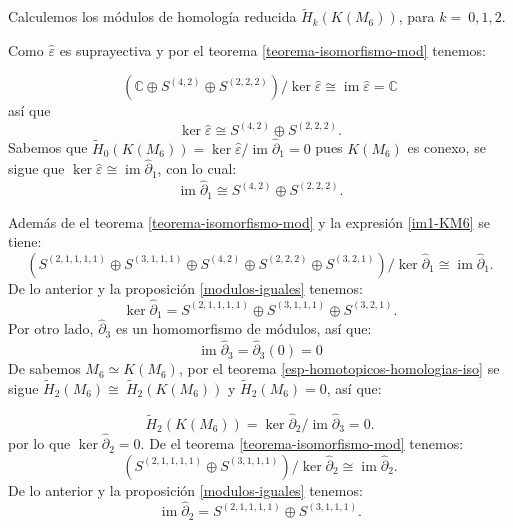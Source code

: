 \documentclass[12pt]{book}
\theoremstyle{definition}
\DeclareMathOperator{\im}{im}
\newcounter{in}
\begin{document}

Calculemos los módulos de homología reducida $\widetilde
H_{k}(K(M_{6}))$, para $k=~0,1,2$.

Como $\widehat\varepsilon$ es suprayectiva y por el teorema
\ref{teorema-isomorfismo-mod} tenemos:

\begin{equation*}
  (\mathbb{C} \oplus S^{(4,2)}\oplus S^{(2,2,2)})/\ker\widehat\varepsilon\cong \im \widehat\varepsilon=\mathbb{C}
\end{equation*}
así que
\begin{equation*}
  \label{ker0-KM6}
  \ker\widehat\varepsilon\cong S^{(4,2)}\oplus S^{(2,2,2)}.
\end{equation*}
Sabemos que $\widetilde H_{0}(K(M_{6}))=\ker \widehat\varepsilon/\im
\widehat\partial_{1}=0$ pues $K(M_{6})$ es conexo, se sigue que $\ker \widehat\varepsilon\cong
\im\widehat\partial_{1}$, con lo cual:
\begin{equation}
  \label{im1-KM6}
  \im \widehat\partial_{1}\cong S^{(4,2)}\oplus S^{(2,2,2)}.
\end{equation}

Además de el teorema \ref{teorema-isomorfismo-mod} y la expresión \ref{im1-KM6} se tiene:
$$(S^{(2,1,1,1,1)}\oplus S^{(3,1,1,1)}\oplus S^{(4,2)}\oplus
      S^{(2,2,2)}\oplus S^{(3,2,1)})/\ker \widehat\partial_{1}\cong \im \widehat\partial_{1}.$$
De lo anterior y la proposición \ref{modulos-iguales} tenemos:
\begin{equation}
  \label{ker1-KM6}
  \ker \widehat\partial_{1}=S^{(2,1,1,1,1)}\oplus S^{(3,1,1,1)}\oplus S^{(3,2,1)}.
\end{equation}
Por otro lado, $\widehat\partial_{3}$ es un homomorfismo de módulos, así que:
\begin{equation*}
\im\widehat\partial_{3}=\widehat\partial_{3}(0)=0
\label{im3-KM6}
\end{equation*}
De \cite{larrion2009clique} sabemos $M_{6}\simeq K(M_{6})$,
por el teorema \ref{esp-homotopicos-homologias-iso} se sigue $\widetilde H_{2}(M_{6})\cong~\widetilde H_{2}(K(M_{6}))$ y  $\widetilde
H_{2}(M_{6})=0$, así que:

\begin{equation*}
\widetilde H_{2}(K(M_{6}))=\ker \widehat\partial_{2}/\im \widehat\partial_{3}=0.
\end{equation*}
por lo que $\ker \widehat\partial_{2}=0$. De el teorema
\ref{teorema-isomorfismo-mod} tenemos:
$$(S^{(2,1,1,1,1)}\oplus S^{(3,1,1,1)})/\ker \widehat\partial_{2}\cong \im
\widehat\partial_{2}.$$
De lo anterior y la proposición \ref{modulos-iguales} tenemos:
\begin{equation}
  \im \widehat\partial_{2}=S^{(2,1,1,1,1)}\oplus S^{(3,1,1,1)}.
  \label{im2-KM6}
\end{equation}
\end{document}
